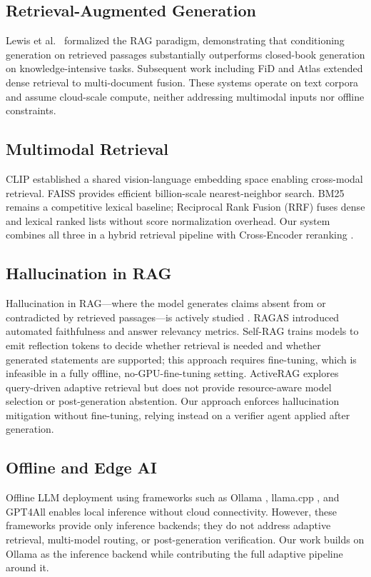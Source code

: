 \documentclass[conference]{IEEEtran}
\begin{document}
\subsection{Retrieval-Augmented Generation}
Lewis et al.\ \cite{lewis2020rag} formalized the RAG paradigm, demonstrating
that conditioning generation on retrieved passages substantially outperforms
closed-book generation on knowledge-intensive tasks. Subsequent work
including FiD \cite{izacard2021leveraging} and Atlas \cite{izacard2022atlas}
extended dense retrieval to multi-document fusion. These systems operate on
text corpora and assume cloud-scale compute, neither addressing multimodal
inputs nor offline constraints.

\subsection{Multimodal Retrieval}
CLIP \cite{radford2021clip} established a shared vision-language embedding
space enabling cross-modal retrieval. FAISS \cite{johnson2019billion} provides
efficient billion-scale nearest-neighbor search. BM25 \cite{robertson2009probabilistic}
remains a competitive lexical baseline; Reciprocal Rank Fusion (RRF)
\cite{cormack2009reciprocal} fuses dense and lexical ranked lists without
score normalization overhead. Our system combines all three in a hybrid
retrieval pipeline with Cross-Encoder reranking \cite{nogueira2019passage}.

\subsection{Hallucination in RAG}
Hallucination in RAG—where the model generates claims absent from or
contradicted by retrieved passages—is actively studied \cite{huang2023survey,
ji2023survey}. RAGAS \cite{es2023ragas} introduced automated faithfulness
and answer relevancy metrics. Self-RAG \cite{asai2024selfrag} trains models
to emit reflection tokens to decide whether retrieval is needed and whether
generated statements are supported; this approach requires fine-tuning,
which is infeasible in a fully offline, no-GPU-fine-tuning setting.
ActiveRAG \cite{wang2024activerag} explores query-driven adaptive retrieval
but does not provide resource-aware model selection or post-generation
abstention. Our approach enforces hallucination mitigation without
fine-tuning, relying instead on a verifier agent applied after generation.

\subsection{Offline and Edge AI}
Offline LLM deployment using frameworks such as Ollama \cite{ollama2023},
llama.cpp \cite{llamacpp}, and GPT4All \cite{gpt4all} enables local inference
without cloud connectivity. However, these frameworks provide only inference
backends; they do not address adaptive retrieval, multi-model routing, or
post-generation verification. Our work builds on Ollama as the inference
backend while contributing the full adaptive pipeline around it.
\end{document}
